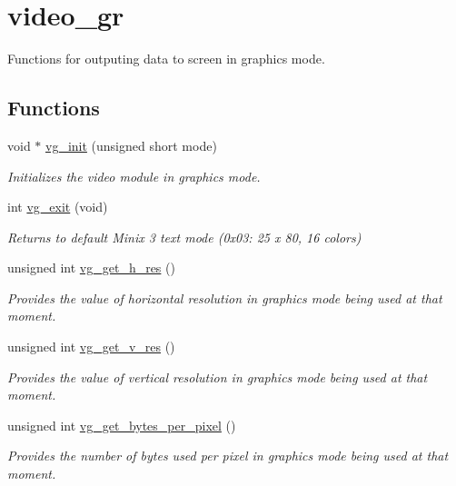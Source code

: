 \hypertarget{group__video__gr}{}\section{video\+\_\+gr}
\label{group__video__gr}


Functions for outputing data to screen in graphics mode.  


\subsection*{Functions}
\begin{DoxyCompactItemize}
\item 
void $\ast$ \hyperlink{group__video__gr_gacef21667c79365d57a084bed994c2189}{vg\+\_\+init} (unsigned short mode)
\begin{DoxyCompactList}\small\item\em Initializes the video module in graphics mode. \end{DoxyCompactList}\item 
int \hyperlink{group__video__gr_ga42f593e6656f1a978315aff02b1bcebf}{vg\+\_\+exit} (void)
\begin{DoxyCompactList}\small\item\em Returns to default Minix 3 text mode (0x03\+: 25 x 80, 16 colors) \end{DoxyCompactList}\item 
unsigned int \hyperlink{group__video__gr_ga3fc3f07355f5cad0248d1c426f185d00}{vg\+\_\+get\+\_\+h\+\_\+res} ()
\begin{DoxyCompactList}\small\item\em Provides the value of horizontal resolution in graphics mode being used at that moment. \end{DoxyCompactList}\item 
unsigned int \hyperlink{group__video__gr_ga90eacdd060b588a092805bfc9227a54e}{vg\+\_\+get\+\_\+v\+\_\+res} ()
\begin{DoxyCompactList}\small\item\em Provides the value of vertical resolution in graphics mode being used at that moment. \end{DoxyCompactList}\item 
unsigned int \hyperlink{group__video__gr_gafd3e5d6a8df0f0b3c5a23fc10f715348}{vg\+\_\+get\+\_\+bytes\+\_\+per\+\_\+pixel} ()
\begin{DoxyCompactList}\small\item\em Provides the number of bytes used per pixel in graphics mode being used at that moment. \end{DoxyCompactList}\item 

\end{DoxyCompactItemize}
